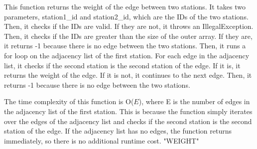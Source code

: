 \documentclass[a4paper]{article}
\begin{document}
			This function returns the weight of the edge between two stations. It takes two parameters, {\color{draculapurple}station1\_id} and {\color{draculapurple}station2\_id}, which are the IDs of the two stations.
			Then, it checks if the IDs are valid. If they are not, it throws an {\color{draculapurple}IllegalException}. Then, it checks if the IDs are greater than the size of the outer array. If they are, it returns {\color{draculapurple}-1} because there is no edge between the two stations.
			Then, it runs a for loop on the adjacency list of the first station. For each edge in the adjacency list, it checks if the second station is the second station of the edge. If it is, it returns the weight of the edge. If it is not, it continues to the next edge.
			Then, it returns {\color{draculapurple}-1} because there is no edge between the two stations.

			The time complexity of this function is {\color{lightblue}O($E$)}, where {\color{draculapurple}E} is the number of edges in the adjacency list of the first station. 
			This is because the function simply iterates over the edges of the adjacency list and checks if the second station is the second station of the edge. If 
			the adjacency list has no edges, the function returns immediately, so there is no additional runtime cost.
			{\color{GoldenYellow}"WEIGHT"}
\end{document}
